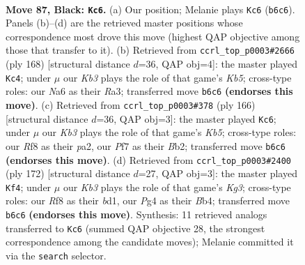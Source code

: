 \documentclass[11pt]{article}
\begin{document}
\clearpage

\begin{figure}[p]\centering
\begin{subfigure}{0.46\textwidth}\centering
\resizebox{\linewidth}{!}{%
\newchessgame
\chessboard[
  setfen={5r2/5p2/nk4p1/4P2p/4NPp1/8/6KP/1B1b4 b - - 33 87},
  showmover=false,
  pgfstyle=straightmove, color=movearrow, markmove={b6-c6}
]}
\caption{}
\end{subfigure}\hfill
\begin{subfigure}{0.46\textwidth}\centering
\resizebox{\linewidth}{!}{%
\newchessgame
\chessboard[
  setfen={8/4k3/4p1p1/1K2P2p/5P1P/R5P1/8/1r6 w - - 21 85},
  showmover=false,
  pgfstyle=straightmove, color=movearrow, markmove={b5-c4}
]}
\caption{}
\end{subfigure}
\\[4pt]
\begin{subfigure}{0.46\textwidth}\centering
\resizebox{\linewidth}{!}{%
\newchessgame
\chessboard[
  setfen={8/5k2/8/1K1pP3/1PpP2b1/2P5/pB6/8 w - - 0 84},
  showmover=false,
  pgfstyle=straightmove, color=movearrow, markmove={b5-c6}
]}
\caption{}
\end{subfigure}\hfill
\begin{subfigure}{0.46\textwidth}\centering
\resizebox{\linewidth}{!}{%
\newchessgame
\chessboard[
  setfen={4k3/5p2/4pPp1/4P3/1BpP3P/2P3K1/8/3b4 w - - 83 87},
  showmover=false,
  pgfstyle=straightmove, color=movearrow, markmove={g3-f4}
]}
\caption{}
\end{subfigure}
\caption{\textbf{Move 87, Black: \texttt{Kc6}.} (a) Our position; Melanie plays \texttt{Kc6} (\texttt{b6c6}). Panels (b)--(d) are the retrieved master positions whose correspondence most drove this move (highest QAP objective among those that transfer to it). (b) Retrieved from \texttt{ccrl\_top\_p0003\#2666} (ply 168) [structural distance $d$=36, QAP obj=4]: the master played \texttt{Kc4}; under $\mu$ our \emph{Kb3} plays the role of that game's \emph{Kb5}; cross-type roles: our \emph{N}a6 as their \emph{R}a3; transferred move \texttt{b6c6} \textbf{(endorses this move)}. (c) Retrieved from \texttt{ccrl\_top\_p0003\#378} (ply 166) [structural distance $d$=36, QAP obj=3]: the master played \texttt{Kc6}; under $\mu$ our \emph{Kb3} plays the role of that game's \emph{Kb5}; cross-type roles: our \emph{R}f8 as their \emph{p}a2, our \emph{P}f7 as their \emph{B}b2; transferred move \texttt{b6c6} \textbf{(endorses this move)}. (d) Retrieved from \texttt{ccrl\_top\_p0003\#2400} (ply 172) [structural distance $d$=27, QAP obj=3]: the master played \texttt{Kf4}; under $\mu$ our \emph{Kb3} plays the role of that game's \emph{Kg3}; cross-type roles: our \emph{R}f8 as their \emph{b}d1, our \emph{P}g4 as their \emph{B}b4; transferred move \texttt{b6c6} \textbf{(endorses this move)}. Synthesis: 11 retrieved analogs transferred to \texttt{Kc6} (summed QAP objective 28, the strongest correspondence among the candidate moves); Melanie committed it via the \texttt{search} selector.}
\label{fig:thought-m173}
\end{figure}
\end{document}
